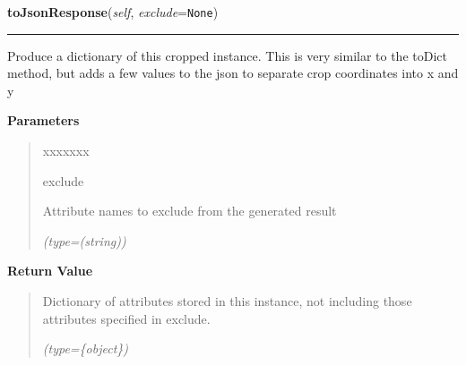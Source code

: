     \label{src:dao:model:manual_cropped:manual_cropped:toJsonResponse}

    \vspace{0.5ex}

\hspace{.8\funcindent}\begin{boxedminipage}{\funcwidth}

    \raggedright \textbf{toJsonResponse}(\textit{self}, \textit{exclude}={\tt None})

    \vspace{-1.5ex}

    \rule{\textwidth}{0.5\fboxrule}
\setlength{\parskip}{2ex}
    Produce a dictionary of this cropped instance. This is very similar to 
    the toDict method, but adds a few values to the json to separate crop 
    coordinates into x and y

\setlength{\parskip}{1ex}
      \textbf{Parameters}
      \vspace{-1ex}

      \begin{quote}
        \begin{Ventry}{xxxxxxx}

          \item[exclude]

          Attribute names to exclude from the generated result

            {\it (type=(string))}

        \end{Ventry}

      \end{quote}

      \textbf{Return Value}
    \vspace{-1ex}

      \begin{quote}
      Dictionary of attributes stored in this instance, not including those
      attributes specified in exclude.

      {\it (type=\{object\})}

      \end{quote}

    \end{boxedminipage}

